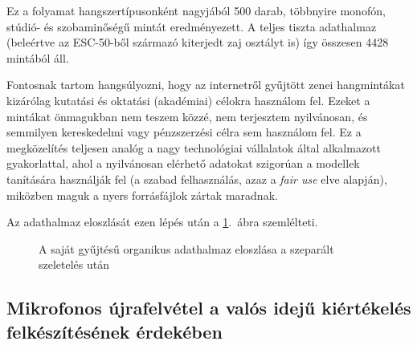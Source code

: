 Ez a folyamat hangszertípusonként nagyjából 500 darab, többnyire monofón, stúdió- és szobaminőségű mintát eredményezett. A teljes tiszta adathalmaz (beleértve az ESC-50-ből származó kiterjedt zaj osztályt is) így összesen 4428 mintából áll.

Fontosnak tartom hangsúlyozni, hogy az internetről gyűjtött zenei hangmintákat kizárólag kutatási és oktatási (akadémiai) célokra használom fel. Ezeket a mintákat önmagukban nem teszem közzé, nem terjesztem nyilvánosan, és semmilyen kereskedelmi vagy pénzszerzési célra sem használom fel. Ez a megközelítés teljesen analóg a nagy technológiai vállalatok által alkalmazott gyakorlattal, ahol a nyilvánosan elérhető adatokat szigorúan a modellek tanítására használják fel (a szabad felhasználás, azaz a \textit{fair use} elve alapján), miközben maguk a nyers forrásfájlok zártak maradnak.

Az adathalmaz eloszlását ezen lépés után a \ref{fig:organic_class_distribution}.~ábra szemlélteti.

\begin{figure}[H]
\centering
{}
\caption{A saját gyűjtésű organikus adathalmaz eloszlása a szeparált szeletelés után}
\label{fig:organic_class_distribution}
\end{figure}

\subsection{Mikrofonos újrafelvétel a valós idejű kiértékelés felkészítésének érdekében}
\label{subsec:mic_recording}

